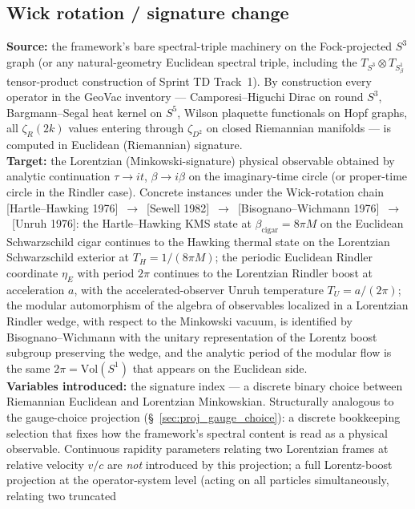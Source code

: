 \documentclass[11pt]{article}
\begin{document}
\subsection{Wick rotation / signature change}
\label{sec:proj_wick_rotation}
\textbf{Source:} the framework's bare spectral-triple machinery on
the Fock-projected $S^3$ graph (or any natural-geometry Euclidean
spectral triple, including the $T_{S^3} \otimes T_{S^1_\beta}$
tensor-product construction of Sprint TD Track~1).  By construction
every operator in the GeoVac inventory ---
Camporesi--Higuchi Dirac on round $S^3$, Bargmann--Segal heat
kernel on $S^5$, Wilson plaquette functionals on Hopf graphs, all
$\zeta_R(2k)$ values entering through $\zeta_{D^2}$ on closed
Riemannian manifolds --- is computed in Euclidean (Riemannian)
signature.\\
\textbf{Target:} the Lorentzian (Minkowski-signature) physical
observable obtained by analytic continuation
$\tau \to i t$, $\beta \to i \beta$ on the imaginary-time circle
(or proper-time circle in the Rindler case).  Concrete instances
under the Wick-rotation chain
[Hartle--Hawking 1976]~$\to$~[Sewell 1982]~$\to$~[Bisognano--Wichmann
1976]~$\to$~[Unruh 1976]:
the Hartle--Hawking KMS state at
$\beta_{\mathrm{cigar}} = 8\pi M$ on the Euclidean Schwarzschild
cigar continues to the Hawking thermal state on the Lorentzian
Schwarzschild exterior at $T_H = 1/(8\pi M)$; the periodic
Euclidean Rindler coordinate $\eta_E$ with period $2\pi$ continues
to the Lorentzian Rindler boost at acceleration $a$, with the
accelerated-observer Unruh temperature $T_U = a/(2\pi)$; the modular
automorphism of the algebra of observables localized in a Lorentzian
Rindler wedge, with respect to the Minkowski vacuum, is identified
by Bisognano--Wichmann with the unitary representation of the Lorentz
boost subgroup preserving the wedge, and the analytic period of the
modular flow is the same $2\pi = \mathrm{Vol}(S^1)$ that appears on
the Euclidean side.\\
\textbf{Variables introduced:} the signature index --- a discrete
binary choice between Riemannian Euclidean and Lorentzian
Minkowskian.  Structurally analogous to the gauge-choice projection
(\S~\ref{sec:proj_gauge_choice}): a discrete bookkeeping selection
that fixes how the framework's spectral content is read as a physical
observable.  Continuous rapidity parameters relating two Lorentzian
frames at relative velocity $v/c$ are \emph{not} introduced by this
projection; a full Lorentz-boost projection at the operator-system
level (acting on all particles simultaneously, relating two truncated
\end{document}
